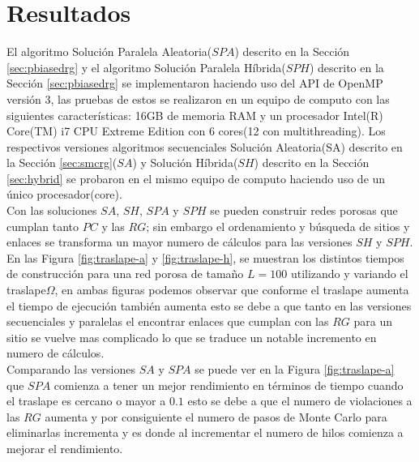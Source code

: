 \chapter{Resultados}
\label{champ:results}
\bigskip
\barra
\bigskip
El algoritmo Solución Paralela Aleatoria($SPA$) descrito en la Sección \ref{sec:pbiasedrg} y el algoritmo Solución Paralela Híbrida($SPH$) descrito en la Sección \ref{sec:pbiasedrg} se implementaron haciendo uso del API de OpenMP versi\'on 3, las pruebas de estos se realizaron en un equipo de computo con las siguientes características: 16GB de memoria  RAM y un procesador Intel(R) Core(TM) i7 CPU  Extreme Edition con 6 cores(12 con multithreading). Los respectivos versiones  algoritmos secuenciales Solución Aleatoria(SA) descrito en la Sección \ref{sec:smcrg}($SA$) y Solución Híbrida($SH$) descrito en la Sección \ref{sec:hybrid} se probaron en el mismo equipo de computo haciendo uso de un único procesador(core).\\

Con las soluciones $SA$, $SH$, $SPA$ y $SPH$ se pueden construir redes porosas que cumplan tanto $PC$ y las $RG$; sin embargo el ordenamiento y búsqueda de sitios y enlaces se transforma un mayor numero de cálculos para las versiones $SH$ y $SPH$. En las Figura \ref{fig:traslape-a} y \ref{fig:traslape-h}, se muestran los distintos tiempos de construcción para una red porosa de tamaño $L=100$ utilizando y variando el traslape$\Omega$, en ambas figuras podemos observar que conforme el traslape aumenta el tiempo de ejecución también aumenta esto se debe a que tanto en las versiones secuenciales y paralelas el encontrar enlaces que cumplan con las $RG$ para un sitio se vuelve mas complicado lo que se traduce un notable incremento en numero de cálculos.\\

Comparando las versiones $SA$ y $SPA$ se puede ver en la Figura \ref{fig:traslape-a} que $SPA$ comienza a tener un mejor rendimiento en términos de tiempo cuando el traslape es cercano o mayor a $0.1$ esto se debe a que el numero de violaciones a las $RG$ aumenta y por consiguiente el numero de pasos de Monte Carlo para eliminarlas incrementa y es donde al incrementar el numero de hilos comienza a mejorar el rendimiento.\\

